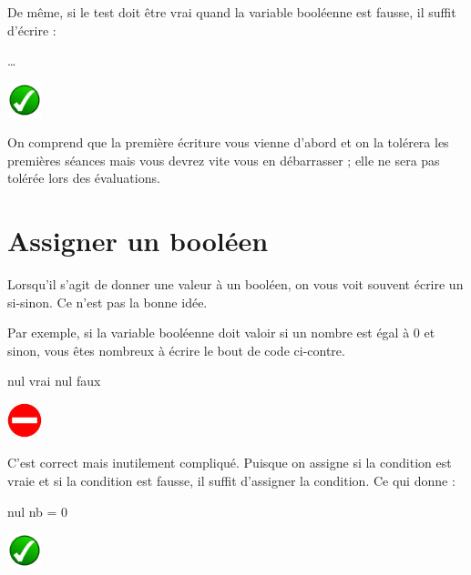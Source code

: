 	\bigskip
	\begin{minipage}{9cm}
		De même, si le test doit être vrai quand la variable booléenne
		est fausse, il suffit d'écrire : 
	\end{minipage}
	\quad
	\begin{minipage}{4cm}	
		\begin{LDA}
			\Stmt \dots
		\EndIf
		\end{LDA}
	\end{minipage}
	\hskip-5mm
	\includegraphics[width=1cm]{icon/do}

	\bigskip
	On comprend que la première écriture vous vienne
	d'abord et on la tolérera les premières séances
	mais vous devrez vite vous en débarrasser ;
	elle ne sera pas tolérée lors des évaluations.
	
\section{Assigner un booléen}

	Lorsqu'il s'agit de donner une valeur à un booléen,
	on vous voit souvent écrire un si-sinon.
	Ce n'est pas la bonne idée.

	\bigskip
	\begin{minipage}{9cm}
		Par exemple,
		si la variable booléenne \lda{nul} 
		doit valoir  si un nombre est égal à 0
		et  sinon,
		vous êtes nombreux à écrire le bout de code ci-contre.		
	\end{minipage}
	\quad
	\begin{minipage}{4cm}
		\begin{LDA}
		\If{nb = 0}
			\Let nul \Gets vrai
		\Else
			\Let nul \Gets faux
		\EndIf
		\end{LDA}
	\end{minipage}
	\hskip-5mm
	\includegraphics[width=1cm]{icon/dont}

	\bigskip
	\begin{minipage}{9cm}
		C'est correct mais inutilement compliqué.
		Puisque on assigne  si la condition
		est vraie et  si la condition est
		fausse, il suffit d'assigner la condition.
		Ce qui donne :
	\end{minipage}
	\quad
	\begin{minipage}{4cm}
		\begin{LDA}
		\Let nul \Gets nb = 0
		\end{LDA}
	\end{minipage}
	\hskip-5mm
	\includegraphics[width=1cm]{icon/do}

